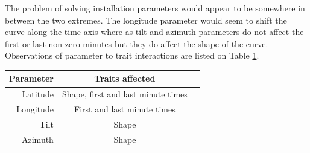 The problem of solving installation parameters would appear to be somewhere in between the two extremes. The longitude parameter would seem to shift the curve along the time axis where as tilt and azimuth parameters do not affect the first or last non-zero minutes but they do affect the shape of the curve. Observations of parameter to trait interactions are listed on Table \ref{table_traits}.



\begin{table}[H]
\centering
\begin{tabular}{r|cc} \hline\hline

 Parameter & Traits affected\\ \hline
 Latitude & Shape, first and last minute times\\
 Longitude & First and last minute times\\
 Tilt & Shape\\
 Azimuth & Shape\\

\hline\hline
\end{tabular}
\label{table_traits}
\end{table}









